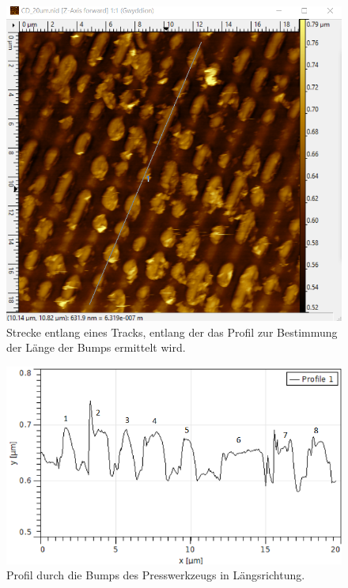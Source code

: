 \begin{figure}[h]
    \centering
    \includegraphics[scale = 0.65]{Bilder/CD20Laenge.png}
    \caption{Strecke entlang eines Tracks, entlang der das Profil zur Bestimmung der Länge der Bumps ermittelt wird.}
    \label{bild:CD20Laenge}
\end{figure}

\begin{figure}[h]
    \centering
    \includegraphics[scale = 0.65]{Bilder/CD20LaengeProfil.png}
    \caption{Profil durch die Bumps des Presswerkzeugs in Längsrichtung.}
    \label{bild:CD20LaengeProfil}
\end{figure}

